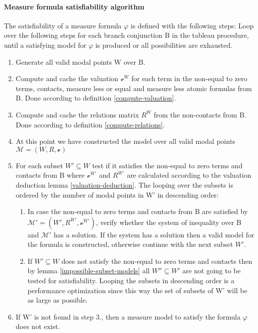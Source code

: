 \documentclass{article}
\newcommand{\vE}{\mathscr{v}}
\begin{document}
	\paragraph{Measure formula satisfiability algorithm} The satisfiability of a measure formula $\varphi$ is defined with the following steps:
\newline
\newline
	Loop over the following steps for each branch conjunction B in the tableau procedure, until a satisfying model for $\varphi$ is produced or all possibilities are exhausted.
	\begin{enumerate}
		\item Generate all valid modal points W over B.%
		\item Compute and cache the valuation $\vE^W$ for each term in the non-equal to zero terms, contacts, 
			measure less or equal and measure less atomic formulas   from B. Done according to definition \ref{compute-valuation}.
		\item Compute and cache the relations matrix $R^W$ from the non-contacts from B. Done according to definition \ref{compute-relations}.
		\item At this point we have constructed the model over all valid modal points $\mathcal{M} = (W, R, \vE)$
		\item For each subset $W' \subseteq W$ test if it satisfies the non-equal to zero terms and contacts from B where $\vE^{W'}$ and $R^{W'}$ are calculated according to the valuation deduction lemma \ref{valuation-deduction}. The looping over the subsets is ordered by the number of modal points in W' in descending order:
		\begin{enumerate}
		\item In case the non-equal to zero terms and contacts from B are satisfied by $\mathcal{M'} = (W', R^{W'}, \vE^{W'})$, 
			verify whether the system of inequality over B and $\mathcal{M'}$ has a solution. 
			If the system has a solution then a valid model for the formula is constructed, otherwise continue with the next subset $W'$.
		\item If $W'  \subseteq W$ does not satisfy the non-equal to zero terms and contacts  
			then by lemma \ref{impossible-subset-models} all $W'' \subseteq W'$ are not going to be tested for satisfiability.
			Looping the subsets in descending order is a performance optimization since this way the set of subsets of W' will be as large as possible.
		\end{enumerate}
		\item If W' is not found in step 3., then a measure model to satisfy the formula $\varphi$ does not exist.
	\end{enumerate}
\end{document}
